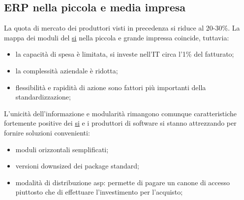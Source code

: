 \subsection{ERP nella piccola e media impresa}\label{sub:erp_nella_piccola_e_media_impresa} %
La quota di mercato dei produttori visti in precedenza si riduce al 20-30\%.
La mappa dei moduli del \hyperref[def:si]{si} nella piccola e grande impressa coincide, tuttavia:
\begin{itemize}
    \item la capacità di spesa è limitata, si investe nell'IT circa l'1\% del fatturato;
    \item la complessità aziendale è ridotta;
    \item flessibilità e rapidità di azione sono fattori più importanti della standardizzazione;
\end{itemize}
L'unicità dell'informazione e modularità rimangono comunque caratteristiche fortemente positive dei \hyperref[def:si]{si} e i produttori di software si stanno attrezzando per fornire soluzioni convenienti:
\begin{itemize}
    \item moduli orizzontali semplificati;
    \item versioni downsized dei package standard;
    \item modalità di distribuzione \ac{asp}: permette di pagare un canone di accesso piuttosto che di effettuare l'investimento per l'acquisto;
\end{itemize}
%
